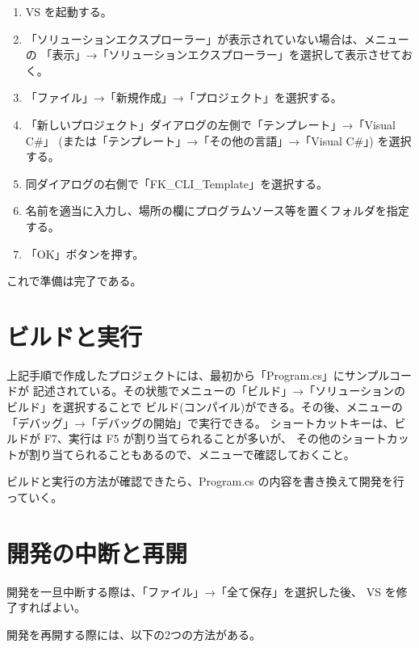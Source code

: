\documentclass[a4paper]{jsarticle}
\begin{document}
\begin{enumerate}

 \item VS を起動する。

 \item 「ソリューションエクスプローラー」が表示されていない場合は、メニューの
	「表示」→「ソリューションエクスプローラー」を選択して表示させておく。

 \item 「ファイル」→「新規作成」→「プロジェクト」を選択する。

 \item 「新しいプロジェクト」ダイアログの左側で「テンプレート」→「Visual C\#」
	(または「テンプレート」→「その他の言語」→「Visual C\#」) を選択する。

 \item 同ダイアログの右側で「FK\_CLI\_Template」を選択する。

 \item 名前を適当に入力し、場所の欄にプログラムソース等を置くフォルダを指定する。

 \item 「OK」ボタンを押す。

\end{enumerate}

これで準備は完了である。

\section{ビルドと実行}

上記手順で作成したプロジェクトには、最初から「Program.cs」にサンプルコードが
記述されている。その状態でメニューの「ビルド」→「ソリューションのビルド」を選択することで
ビルド(コンパイル)ができる。その後、メニューの「デバッグ」→「デバッグの開始」で実行できる。
ショートカットキーは、ビルドが F7、実行は F5 が割り当てられることが多いが、
その他のショートカットが割り当てられることもあるので、メニューで確認しておくこと。

ビルドと実行の方法が確認できたら、Program.cs の内容を書き換えて開発を行っていく。

\section{開発の中断と再開}

開発を一旦中断する際は、「ファイル」→「全て保存」を選択した後、
VS を修了すればよい。

開発を再開する際には、以下の2つの方法がある。
\end{document}
